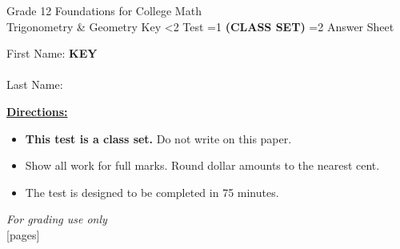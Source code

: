 \documentclass[addpoints]{exam}
\newcommand{\event}{Trigonometry \& Geometry}
\newcommand{\tournament}{}
\def\type{0}
\begin{document}
\begin{center}
    {\huge Grade 12 Foundations for College Math \\ \event
    \ifprintanswers \space Key
    \else \space \ifnum\type<2 Test \fi \ifnum\type=1 \textbf{(CLASS SET)} \fi
          \ifnum\type=2 Answer Sheet \fi
    \fi \\ \vspace{3mm}\tournament\vspace{1mm}}
\end{center}

\vspace{.25\textheight}

\begin{center}
    First Name: \ifprintanswers
    \underline{\hspace{3.5cm}}\textbf{KEY}\underline{\hspace{5.5cm}}\\\ \vspace{5mm}
    \else \underline{\hspace{10cm}}\\ \vspace{5mm} \fi
    Last Name: \underline{\hspace{10cm}}\\ \vspace{5mm}
\end{center}

\noindent\textbf{\underline{Directions:}}
\begin{itemize}
    \ifnum\type=1 \item \textbf{This test is a class set.} Do not write on this paper. \fi
    \item Show all work for full marks. Round dollar amounts to the nearest cent.
    \item The test is designed to be completed in 75 minutes.
\end{itemize}
\begin{center}
\textit{For grading use only}\\
[pages]
\end{center}
\end{document}
